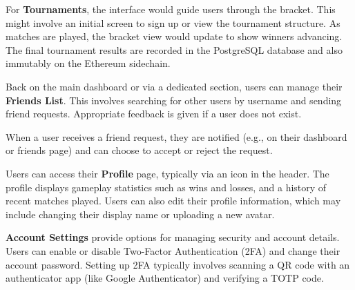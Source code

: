 For \textbf{Tournaments}, the interface would guide users through the bracket. This might involve an initial screen to sign up or view the tournament structure. As matches are played, the bracket view would update to show winners advancing. The final tournament results are recorded in the PostgreSQL database and also immutably on the Ethereum sidechain.

\begin{figure}[H]
\end{figure}

Back on the main dashboard or via a dedicated section, users can manage their \textbf{Friends List}. This involves searching for other users by username and sending friend requests. Appropriate feedback is given if a user does not exist.

\begin{figure}[H]
\end{figure}

When a user receives a friend request, they are notified (e.g., on their dashboard or friends page) and can choose to accept or reject the request.

\begin{figure}[H]
\end{figure}

Users can access their \textbf{Profile} page, typically via an icon in the header. The profile displays gameplay statistics such as wins and losses, and a history of recent matches played. Users can also edit their profile information, which may include changing their display name or uploading a new avatar.

\begin{figure}[H]
\end{figure}

\textbf{Account Settings} provide options for managing security and account details. Users can enable or disable Two-Factor Authentication (2FA) and change their account password. Setting up 2FA typically involves scanning a QR code with an authenticator app (like Google Authenticator) and verifying a TOTP code.

